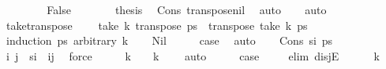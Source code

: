 \begin{isabellebody}
\ \ \isamarkupfalse%
\isanewline
\ \ \ \ \isamarkupfalse%
\ False\isanewline
\ \ \ \ \isamarkupfalse%
\ \isamarkupfalse%
\ {\isacharquery}{\kern0pt}thesis\ \isamarkupfalse%
\ Cons\ transpose{\isacharunderscore}{\kern0pt}nil\ \isamarkupfalse%
\ auto\isanewline
\ \ \isamarkupfalse%
\isanewline
{}\isamarkupfalse%
\ auto%
\endisatagproof
{\isafoldproof}%
%
\isadelimproof
\isanewline
%
\endisadelimproof
\isanewline
{}\isamarkupfalse%
\ take{\isacharunderscore}{\kern0pt}transpose{\isacharcolon}{\kern0pt}\ \isanewline
\ \ \ {\isachardoublequoteopen}take\ k\ {\isacharparenleft}{\kern0pt}transpose\ ps{\isacharparenright}{\kern0pt}\ {\isacharequal}{\kern0pt}\ transpose\ {\isacharparenleft}{\kern0pt}take\ k\ ps{\isacharparenright}{\kern0pt}{\isachardoublequoteclose}\isanewline
%
\isadelimproof
%
\endisadelimproof
%
\isatagproof
{}\isamarkupfalse%
\ {\isacharparenleft}{\kern0pt}induction\ ps\ arbitrary{\isacharcolon}{\kern0pt}\ k{\isacharparenright}{\kern0pt}\isanewline
\ \ \isamarkupfalse%
\ Nil\isanewline
\ \ \isamarkupfalse%
\ \isamarkupfalse%
\ {\isacharquery}{\kern0pt}case\ \isamarkupfalse%
\ auto\isanewline
{}\isamarkupfalse%
\isanewline
\ \ \isamarkupfalse%
\ {\isacharparenleft}{\kern0pt}Cons\ s\isactrlsub i\ ps{\isacharparenright}{\kern0pt}\isanewline
\ \ \isamarkupfalse%
\ \isamarkupfalse%
\ i\ j\ \ {\isachardoublequoteopen}s\isactrlsub i\ {\isacharequal}{\kern0pt}\ {\isacharparenleft}{\kern0pt}i{\isacharcomma}{\kern0pt}j{\isacharparenright}{\kern0pt}{\isachardoublequoteclose}\ \isamarkupfalse%
\ force\isanewline
\ \ \isamarkupfalse%
\ \isamarkupfalse%
\ {\isachardoublequoteopen}k\ {\isacharequal}{\kern0pt}\ {}\ {\isasymor}\ k\ {\isachargreater}{\kern0pt}\ {}{\isachardoublequoteclose}\ \isamarkupfalse%
\ auto\isanewline
\ \ \isamarkupfalse%
\ \isamarkupfalse%
\ {\isacharquery}{\kern0pt}case\ \isanewline
\ \ \isamarkupfalse%
\ {\isacharparenleft}{\kern0pt}elim\ disjE{\isacharparenright}{\kern0pt}\isanewline
\ \ \ \ \isamarkupfalse%
\ {\isachardoublequoteopen}k\ {\isachargreater}{\kern0pt}\ {}{\isachardoublequoteclose}\isanewline
\ \ \ \ \isamarkupfalse%

\end{isabellebody}
